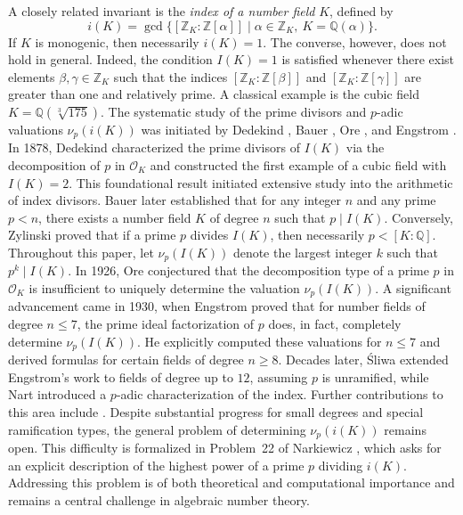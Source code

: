 \documentclass[table]{amsart}
\numberwithin{equation}{section}
\begin{document}
A closely related invariant is the \emph{index of a number field} $K$, defined by
\[
i(K)=\gcd\{[\mathbb{Z}_K:\mathbb{Z}[\alpha]] \mid \alpha\in\mathbb{Z}_K,\ K=\mathbb{Q}(\alpha)\}.
\]
If $K$ is monogenic, then necessarily $i(K)=1$. The converse, however, does not hold in general. Indeed, the condition $I(K)=1$ is satisfied whenever there exist elements $\beta, \gamma \in \mathbb{Z}_K$ such that the indices $[\mathbb{Z}_K : \mathbb{Z}[\beta]]$ and $[\mathbb{Z}_K : \mathbb{Z}[\gamma]]$ are greater than one and relatively prime. A classical example is the cubic field $K = \mathbb{Q}(\sqrt[3]{175})$.
The systematic study of the prime divisors and $p$-adic valuations $\nu_p(i(K))$ was initiated by Dedekind \cite{RD1878}, Bauer \cite{Bauer1907}, Ore \cite{Ore1927}, and Engstrom \cite{Engstrom1930}.
In 1878, Dedekind \cite{RD1878} characterized the prime divisors of $I(K)$ via the decomposition of $p$ in $\mathcal{O}_K$ and constructed the first example of a cubic field with $I(K)=2$. This foundational result initiated extensive study into the arithmetic of index divisors. Bauer \cite{Bauer1907} later established that for any integer $n$ and any prime $p < n$, there exists a number field $K$ of degree $n$ such that $p \mid I(K)$. Conversely, Zylinski \cite{Zylinski1913} proved that if a prime $p$ divides $I(K)$, then necessarily $p < [K: \mathbb{Q}]$. Throughout this paper, let $\nu_p(I(K))$ denote the largest integer $k$ such that $p^{k} \mid I(K)$.
In 1926, Ore \cite{Ore1927} conjectured that the decomposition type of a prime $p$ in $\mathcal{O}_K$ is insufficient to uniquely determine the valuation $\nu_p(I(K))$. A significant advancement came in 1930, when Engstrom \cite{Engstrom1930} proved that for number fields of degree $n \le 7$, the prime ideal factorization of $p$ does, in fact, completely determine $\nu_p(I(K))$. He explicitly computed these valuations for $n \le 7$ and derived formulas for certain fields of degree $n \ge 8$. Decades later, \'Sliwa \cite{Sliwa1982} extended Engstrom's work to fields of degree up to $12$, assuming $p$ is unramified, while Nart \cite{Nart1985} introduced a $p$-adic characterization of the index. Further contributions to this area include \cite{GPP1991, Nak1983, PP2012, SW2003}. Despite substantial progress for small degrees and special ramification types, the general problem of determining $\nu_p(i(K))$ remains open.
This difficulty is formalized in Problem~22 of Narkiewicz \cite{Narkiewicz2004}, which asks for an explicit description of the highest power of a prime $p$ dividing $i(K)$.
Addressing this problem is of both theoretical and computational importance and remains a central challenge in algebraic number theory.
\end{document}
